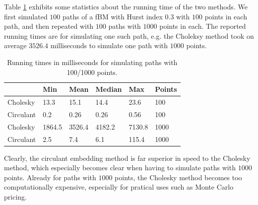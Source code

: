 Table \ref{Tab:Tcr} exhibits some statistics about the running time of the two methods. We first simulated $100$ paths of a fBM with Hurst index $0.3$ with $100$ points in each path, and then repeated with $100$ paths with $1000$ points in each. The reported running times are for simulating one such path, e.g. the Choleksy method took on average $3526.4$ milliseconds to simulate one path with $1000$ points.
\begin{table}[H]
\centering
\begin{tabular}{llllll}\toprule

        & Min    & Mean   & Median & Max    & Points  \\ \hline
Cholesky  & 13.3 & 15.1 & 14.4 & 23.6 & 100 \\
Circulant & 0.2    & 0.26    & 0.26    & 0.56 & 100 \\ \midrule
Cholesky  & 1864.5 & 3526.4 & 4182.2 & 7130.8 & 1000 \\
Circulant & 2.5    & 7.4    & 6.1    & 115.4  & 1000 \\
\bottomrule
\end{tabular}
\caption{Running times in milliseconds for simulating paths with 100/1000 points.}
\label{Tab:Tcr}
\end{table}

Clearly, the circulant embedding method is far superior in speed to the Cholesky method, which especially becomes clear when having to simulate paths with $1000$ points. Already for paths with $1000$ points, the Cholesky method becomes too computationally expensive, especially for pratical uses such as Monte Carlo pricing.



